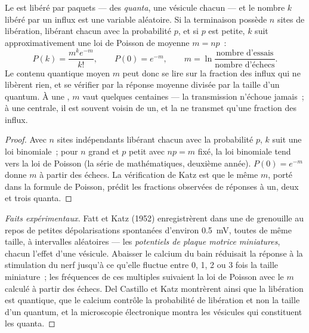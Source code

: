 \begin{theorem}\label{thm:b2:neurons-synapses:quantal}
Le  est libéré par paquets --- des \emph{quanta},
une vésicule chacun --- et le nombre $k$ libéré par un influx est une
variable aléatoire. Si la terminaison possède $n$ sites de libération,
libérant chacun avec la probabilité $p$, et si $p$ est petite, $k$ suit
approximativement une loi de Poisson de moyenne $m = np$~:
\[
P(k) = \frac{m^{k}e^{-m}}{k!}, \qquad P(0) = e^{-m}, \qquad
m = \ln\frac{\text{nombre d'essais}}{\text{nombre d'échecs}}.
\]
Le contenu quantique moyen $m$ peut donc se lire sur la fraction des
influx qui ne libèrent rien, et se vérifier par la réponse moyenne
divisée par la taille d'un quantum. À une , $m$
vaut quelques centaines --- la transmission n'échoue jamais~; à une
 centrale, il est souvent voisin de un, et la  ne transmet
qu'une fraction des influx.
\end{theorem}
\begin{proof}
Avec $n$ sites indépendants libérant chacun avec la probabilité $p$, $k$
suit une loi binomiale~; pour $n$ grand et $p$ petit avec $np = m$ fixé,
la loi binomiale tend vers la loi de Poisson (la série de mathématiques,
deuxième année). $P(0) = e^{-m}$ donne $m$ à partir des échecs. La
vérification de Katz est que le même $m$, porté dans la formule de
Poisson, prédit les fractions observées de réponses à un, deux et trois
quanta.
\end{proof}
\begin{proof}[Faits expérimentaux]
Fatt et Katz (1952) enregistrèrent dans une  de
grenouille au repos de petites dépolarisations spontanées d'environ
\qty{0.5}{mV}, toutes de même taille, à intervalles aléatoires --- les
\emph{potentiels de plaque motrice miniatures}, chacun l'effet d'une
vésicule. Abaisser le calcium du bain réduisait la réponse à la
stimulation du nerf jusqu'à ce qu'elle fluctue entre 0, 1, 2 ou 3 fois la
taille miniature~; les fréquences de ces multiples suivaient la loi de
Poisson avec le
$m$ calculé à partir des échecs. Del Castillo et Katz montrèrent ainsi
que la libération est quantique, que le calcium contrôle la probabilité
de libération et non la taille d'un quantum, et la microscopie
électronique montra les vésicules qui constituent les quanta.
\end{proof}

